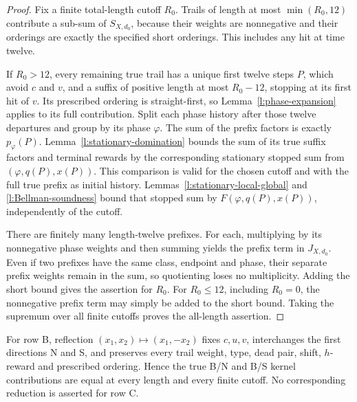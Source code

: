 \begin{proof}
Fix a finite total-length cutoff \(R_0\). Trails of length at most
\(\min(R_0,12)\) contribute a sub-sum of \(S_{X,d_0}\), because
their weights are nonnegative and their orderings are exactly the
specified short orderings. This includes any hit at time twelve.

If \(R_0>12\), every remaining true trail has a unique first twelve
steps \(P\), which avoid \(c\) and \(v\), and a suffix of positive
length at most \(R_0-12\), stopping at its first hit of \(v\).
Its prescribed ordering is straight-first, so
Lemma~\ref{l:phase-expansion} applies to its full contribution.
Split each phase history after those twelve departures and group
by its phase \(\varphi\). The sum of the prefix factors is exactly
\(p_\varphi(P)\). Lemma~\ref{l:stationary-domination} bounds the
sum of its true suffix factors and terminal rewards by the
corresponding stationary stopped sum from
\((\varphi,q(P),x(P))\). This comparison is valid for the chosen
cutoff and with the full true prefix as initial history.
Lemmas~\ref{l:stationary-local-global} and
\ref{l:Bellman-soundness} bound that stopped sum by
\(F(\varphi,q(P),x(P))\), independently of the cutoff.

There are finitely many length-twelve prefixes. For each, multiplying
by its nonnegative phase weights and then summing yields the prefix
term in \(J_{X,d_0}\). Even if two prefixes have the same class,
endpoint and phase, their separate prefix weights remain in the
sum, so quotienting loses no multiplicity. Adding the short bound
gives the assertion for \(R_0\). For \(R_0\le12\), including
\(R_0=0\), the nonnegative prefix term may simply be added to the
short bound. Taking the supremum over all finite cutoffs proves
the all-length assertion.
\end{proof}

\begin{lemma}\label{l:kernel-reflection}
For row B, reflection \((x_1,x_2)\mapsto(x_1,-x_2)\) fixes
\(c,u,v\), interchanges the first directions N and S, and preserves
every trail weight, type, dead pair, shift, \(h\)-reward and
prescribed ordering. Hence the true B/N and B/S kernel contributions
are equal at every length and every finite cutoff.
No corresponding reduction is asserted for row C.
\end{lemma}

